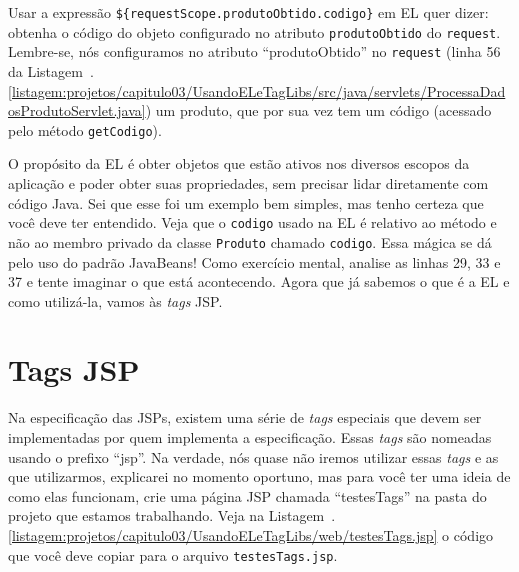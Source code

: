 Usar a expressão \texttt{\$\{requestScope.produtoObtido.codigo\}} em EL quer dizer: obtenha o código do objeto configurado no atributo \texttt{produtoObtido} do \texttt{request}. Lembre-se, nós configuramos no atributo ``produtoObtido'' no \texttt{request} (linha 56 da Listagem~\thechapter.\ref{listagem:projetos/capitulo03/UsandoELeTagLibs/src/java/servlets/ProcessaDadosProdutoServlet.java}) um produto, que por sua vez tem um código (acessado pelo método \texttt{getCodigo}).

O propósito da EL é obter objetos que estão ativos nos diversos escopos da aplicação e poder obter suas propriedades, sem precisar lidar diretamente com código Java. Sei que esse foi um exemplo bem simples, mas tenho certeza que você deve ter entendido. Veja que o \texttt{codigo} usado na EL é relativo ao método  e não ao membro privado da classe \texttt{Produto} chamado \texttt{codigo}. Essa mágica se dá pelo uso do padrão JavaBeans! Como exercício mental, analise as linhas 29, 33 e 37 e tente imaginar o que está acontecendo. Agora que já sabemos o que é a EL e como utilizá-la, vamos às \textit{tags} JSP.


\section{Tags JSP}

Na especificação das JSPs, existem uma série de \textit{tags} especiais que devem ser implementadas por quem implementa a especificação. Essas \textit{tags} são nomeadas usando o prefixo ``jsp''. Na verdade, nós quase não iremos utilizar essas \textit{tags} e as que utilizarmos, explicarei no momento oportuno, mas para você ter uma ideia de como elas funcionam, crie uma página JSP chamada ``testesTags'' na pasta  do projeto que estamos trabalhando. Veja na Listagem~\thechapter.\ref{listagem:projetos/capitulo03/UsandoELeTagLibs/web/testesTags.jsp} o código que você deve copiar para o arquivo \texttt{testesTags.jsp}. 



